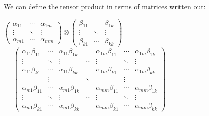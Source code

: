 We can define the tensor product in terms of matrices written out:
\begin{center}
    $\begin{pmatrix}
        \alpha_{11} & \cdots & \alpha_{1m} \\
        \vdots & \ddots & \vdots \\
        \alpha_{m1} & \cdots & \alpha_{mm}
    \end{pmatrix}
    \otimes
    \begin{pmatrix}
        \beta_{11} & \cdots & \beta_{1k} \\
        \vdots & \ddots & \vdots \\
        \beta_{k1} & \cdots & \beta_{kk}
    \end{pmatrix}$
    $=
    \begin{pmatrix}
        \alpha_{11}\beta_{11} & \cdots & \alpha_{11}\beta_{1k} &  & \alpha_{1m}\beta_{11} & \cdots & \alpha_{1m}\beta_{1k} \\
        \vdots & \ddots & \vdots & \cdots & \vdots & \ddots & \vdots \\
        \alpha_{11}\beta_{k1} & \cdots & \alpha_{11}\beta_{kk} &  & \alpha_{1m}\beta_{k1} & \cdots & \alpha_{1m}\beta_{kk} \\
        & \vdots &  & \ddots &  & \vdots &  \\
        \alpha_{m1}\beta_{11} & \cdots & \alpha_{m1}\beta_{1k} &  & \alpha_{mm}\beta_{11} & \cdots & \alpha_{mm}\beta_{1k} \\
        \vdots & \ddots & \vdots & \cdots & \vdots & \ddots & \vdots \\
        \alpha_{m1}\beta_{k1} & \cdots & \alpha_{m1}\beta_{kk} &  & \alpha_{mm}\beta_{k1} & \cdots & \alpha_{mm}\beta_{kk}
    \end{pmatrix}$
\end{center}

\newpage

